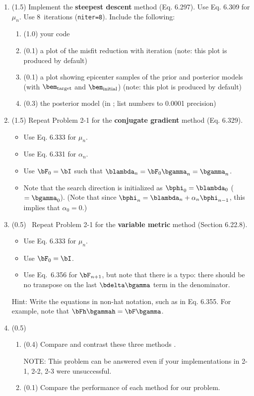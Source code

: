 \documentclass[11pt,titlepage,fleqn]{article}
\begin{document}
\begin{enumerate}
\item (1.5) Implement the {\bf steepest descent} method (Eq. 6.297). Use Eq. 6.309 for $\mu_n$. Use 8~iterations (\verb+niter=8+). Include the following:
%
\begin{enumerate}
\item (1.0) your code
\item (0.1) a plot of the misfit reduction with iteration (note: this plot is produced by default)
\item (0.1) a plot showing epicenter samples of the prior and posterior models (with $\bem_{\rm target}$ and $\bem_{\rm initial}$) (note: this plot is produced by default)
\item (0.3) the posterior model (in ; list numbers to 0.0001 precision)
\end{enumerate}

\label{steep}

\item (1.5) Repeat Problem 2-1 for the {\bf conjugate gradient} method (Eq. 6.329).
%
\begin{itemize}
\item Use Eq. 6.333 for $\mu_n$.
\item Use Eq. 6.331 for $\alpha_n$.
\item Use $\bF_0 = \bI$ such that $\blambda_n = \bF_0\bgamma_n = \bgamma_n$. 
\item Note that the search direction is initialized as $\bphi_0 = \blambda_0$ ($= \bgamma_0$). (Note that since $\bphi_n = \blambda_n + \alpha_n\bphi_{n-1}$, this implies that $\alpha_0 = 0$.)
\end{itemize}

\item (0.5) \ptag\ Repeat Problem 2-1 for the {\bf variable metric} method (Section 6.22.8).
%
\begin{itemize}
\item Use Eq. 6.333 for $\mu_n$.
\item Use $\bF_0 = \bI$.
\item Use Eq.~6.356 for $\bF_{n+1}$, but note that there is a typo: there should be no transpose on the last $\bdelta\bgamma$ term in the denominator.
\end{itemize}
%
Hint: Write the equations in non-hat notation, such as in Eq. 6.355. For example, note that $\bFh\bgammah = \bF\bgamma$.

\item (0.5)
%
\begin{enumerate}
\item (0.4) Compare and contrast these three methods \citep[see][]{Tarantola2005}.

NOTE: This problem can be answered even if your implementations in 2-1, 2-2, 2-3 were unsuccessful.

\item (0.1) Compare the performance of each method for our problem.
\end{enumerate}

\end{enumerate}
\end{document}
